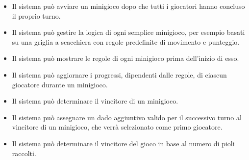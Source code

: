 \begin{itemize}
      \item Il sistema può avviare un minigioco dopo che tutti i giocatori hanno concluso
            il proprio turno.
      \item Il sistema può gestire la logica di ogni semplice minigioco, per esempio 
            basati su una griglia a scacchiera con regole predefinite di movimento e punteggio.
      \item Il sistema può mostrare le regole di ogni minigioco prima dell'inizio di esso.
      \item Il sistema può aggiornare i progressi, dipendenti dalle regole, di ciascun giocatore 
            durante un minigioco.
      \item Il sistema può determinare il vincitore di un minigioco.
      \item Il sistema può assegnare un dado aggiuntivo valido per il successivo turno al
            vincitore di un minigioco, che verrà selezionato come primo giocatore.
      \item Il sistema può determinare il vincitore del gioco in base al numero di pioli raccolti.
\end{itemize}